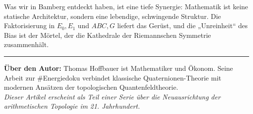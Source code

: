 \documentclass[11pt,a4paper]{article}
\begin{document}
Was wir in Bamberg entdeckt haben, ist eine tiefe Synergie: Mathematik ist keine statische Architektur, sondern eine lebendige, schwingende Struktur. Die Faktorisierung in $E_0, E_1$ und $ABC, G$ liefert das Gerüst, und die „Unreinheit“ des Bias ist der Mörtel, der die Kathedrale der Riemannschen Symmetrie zusammenhält.

\vfill
\noindent\rule{\textwidth}{0.4pt}
\small
\textbf{Über den Autor:} Thomas Hoffbauer ist Mathematiker und Ökonom. Seine Arbeit zur \#Energiedoku verbindet klassische Quaternionen-Theorie mit modernen Ansätzen der topologischen Quantenfeldtheorie. \\
\textit{Dieser Artikel erscheint als Teil einer Serie über die Neuausrichtung der arithmetischen Topologie im 21. Jahrhundert.}
\end{document}
